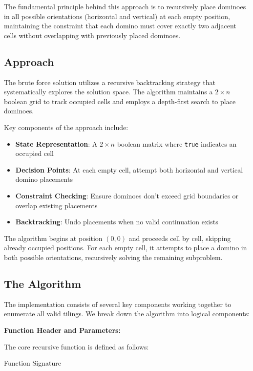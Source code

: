 \documentclass[conference]{IEEEtran}
\begin{document}
The fundamental principle behind this approach is to recursively place dominoes in all possible orientations (horizontal and vertical) at each empty position, maintaining the constraint that each domino must cover exactly two adjacent cells without overlapping with previously placed dominoes.

\subsection{Approach}

The brute force solution utilizes a recursive backtracking strategy that systematically explores the solution space. The algorithm maintains a $2 \times n$ boolean grid to track occupied cells and employs a depth-first search to place dominoes.

Key components of the approach include:

\begin{itemize}
    \item \textbf{State Representation}: A $2 \times n$ boolean matrix where \texttt{true} indicates an occupied cell
    \item \textbf{Decision Points}: At each empty cell, attempt both horizontal and vertical domino placements
    \item \textbf{Constraint Checking}: Ensure dominoes don't exceed grid boundaries or overlap existing placements
    \item \textbf{Backtracking}: Undo placements when no valid continuation exists
\end{itemize}

The algorithm begins at position $(0,0)$ and proceeds cell by cell, skipping already occupied positions. For each empty cell, it attempts to place a domino in both possible orientations, recursively solving the remaining subproblem.

\subsection{The Algorithm}

The implementation consists of several key components working together to enumerate all valid tilings. We break down the algorithm into logical components:

\textbf{Function Header and Parameters:}

The core recursive function is defined as follows:

\begin{algorithm}[htbp]
\caption{Function Signature}
\begin{algorithmic}[1]
\EndProcedure
\end{algorithmic}
\end{algorithm}
\end{document}
